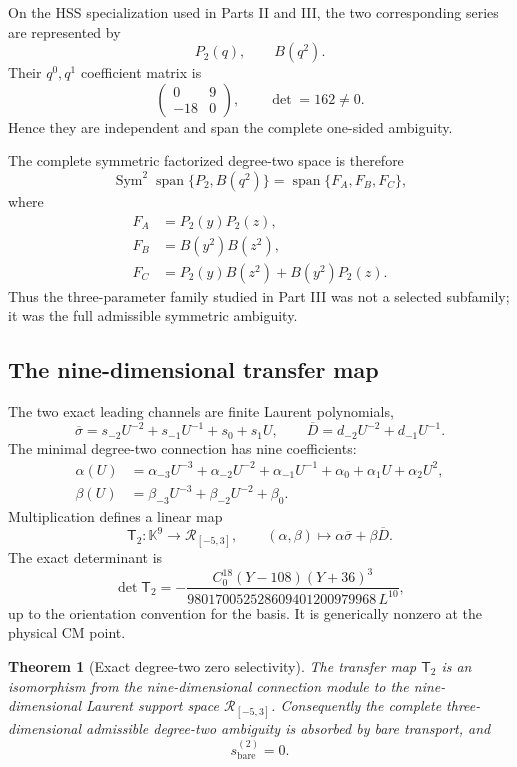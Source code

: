 \documentclass[11pt]{article}
\newtheorem{theorem}{Theorem}[section]
\theoremstyle{definition}
\theoremstyle{remark}
\newcommand{\K}{\mathbb{K}}
\newcommand{\cR}{\mathcal{R}}
\newcommand{\Span}{\operatorname{span}}
\newcommand{\Sym}{\operatorname{Sym}}
\begin{document}
On the HSS specialization used in Parts II and III, the two corresponding series are represented by
\[
P_2(q),\qquad B(q^2).
\]
Their $q^0,q^1$ coefficient matrix is
\[
\begin{pmatrix}
0&9\\
-18&0
\end{pmatrix},
\qquad \det=162\neq0.
\]
Hence they are independent and span the complete one-sided ambiguity.

The complete symmetric factorized degree-two space is therefore
\begin{equation}\label{eq:degree2sym}
\Sym^2\Span\{P_2,B(q^2)\}
=\Span\{F_A,F_B,F_C\},
\end{equation}
where
\begin{align*}
F_A&=P_2(y)P_2(z),\\
F_B&=B(y^2)B(z^2),\\
F_C&=P_2(y)B(z^2)+B(y^2)P_2(z).
\end{align*}
Thus the three-parameter family studied in Part III was not a selected subfamily; it was the full admissible symmetric ambiguity.

\subsection{The nine-dimensional transfer map}

The two exact leading channels are finite Laurent polynomials,
\[
\overline\sigma=s_{-2}U^{-2}+s_{-1}U^{-1}+s_0+s_1U,
\qquad
\overline D=d_{-2}U^{-2}+d_{-1}U^{-1}.
\]
The minimal degree-two connection has nine coefficients:
\begin{align*}
\alpha(U)&=\alpha_{-3}U^{-3}+\alpha_{-2}U^{-2}+\alpha_{-1}U^{-1}
+\alpha_0+\alpha_1U+\alpha_2U^2,\\
\beta(U)&=\beta_{-3}U^{-3}+\beta_{-2}U^{-2}+\beta_0.
\end{align*}
Multiplication defines a linear map
\[
\mathsf T_2:\K^9\longrightarrow \cR_{[-5,3]},
\qquad
(\alpha,\beta)\longmapsto \alpha\overline\sigma+\beta\overline D.
\]
The exact determinant is
\begin{equation}\label{eq:Tdet}
\det\mathsf T_2
=-\frac{C_0^{18}(Y-108)(Y+36)^3}
{980170052528609401200979968\,L^{10}},
\end{equation}
up to the orientation convention for the basis.  It is generically nonzero at the physical CM point.

\begin{theorem}[Exact degree-two zero selectivity]\label{thm:d2zero}
The transfer map $\mathsf T_2$ is an isomorphism from the nine-dimensional connection module to the nine-dimensional Laurent support space $\cR_{[-5,3]}$.  Consequently the complete three-dimensional admissible degree-two ambiguity is absorbed by bare transport, and
\[
s_{\mathrm{bare}}^{(2)}=0.
\]
\end{theorem}
\end{document}

